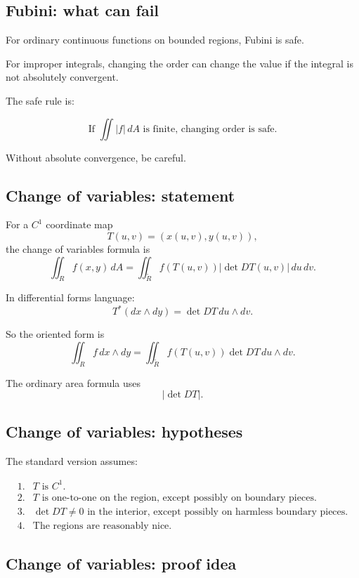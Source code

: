 \subsection*{Fubini: what can fail}

For ordinary continuous functions on bounded regions, Fubini is safe.

For improper integrals, changing the order can change the value if the integral is not
absolutely convergent.

The safe rule is:

\[
\boxed{
    \text{If }\iint |f|\,dA\text{ is finite, changing order is safe.}
}
\]

Without absolute convergence, be careful.

\subsection*{Change of variables: statement}

For a \(C^1\) coordinate map
\[
    T(u,v)=(x(u,v),y(u,v)),
\]
the change of variables formula is
\[
\boxed{
    \iint_R f(x,y)\,dA
    =
    \iint_{\widetilde R}
    f(T(u,v))
    \left|
        \det DT(u,v)
    \right|
    \,du\,dv.
}
\]

In differential forms language:
\[
\boxed{
    T^*(dx\wedge dy)
    =
    \det DT\,du\wedge dv.
}
\]

So the oriented form is
\[
\boxed{
    \iint_R f\,dx\wedge dy
    =
    \iint_{\widetilde R}
    f(T(u,v))\det DT\,du\wedge dv.
}
\]

The ordinary area formula uses
\[
    |\det DT|.
\]

\subsection*{Change of variables: hypotheses}

The standard version assumes:

\[
\begin{array}{ll}
1. & T\text{ is }C^1.\\[1mm]
2. & T\text{ is one-to-one on the region, except possibly on boundary pieces.}\\[1mm]
3. & \det DT\ne0\text{ in the interior, except possibly on harmless boundary pieces.}\\[1mm]
4. & \text{The regions are reasonably nice.}
\end{array}
\]

\subsection*{Change of variables: proof idea}

